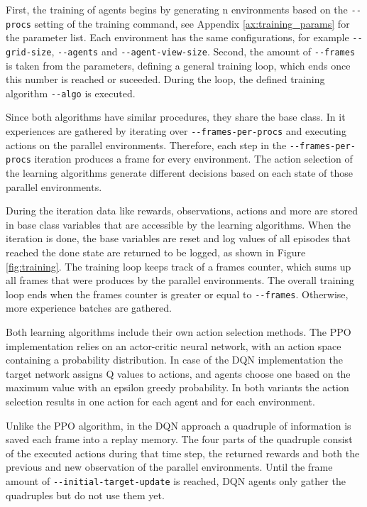 First, the training of agents begins by generating n environments based on the \verb|--procs| setting of the training command, see Appendix \ref{ax:training_params} for the parameter list. Each environment has the same configurations, for example \verb|--grid-size|, \verb|--agents| and \verb|--agent-view-size|. Second, the amount of \verb|--frames| is taken from the parameters, defining a general training loop, which ends once this number is reached or suceeded. During the loop, the defined training algorithm \verb|--algo| is executed.

Since both algorithms have similar procedures, they share the base class. In it experiences are gathered by iterating over \verb|--frames-per-procs| and executing actions on the parallel environments. Therefore, each step in the \verb|--frames-per-procs| iteration produces a frame for every environment. The action selection of the learning algorithms generate different decisions based on each state of those parallel environments.

During the iteration data like rewards, observations, actions and more are stored in base class variables that are accessible by the learning algorithms. When the iteration is done, the base variables are reset and log values of all episodes that reached the done state are returned to be logged, as shown in Figure \ref{fig:training}. The training loop keeps track of a frames counter, which sums up all frames that were produces by the parallel environments. The overall training loop ends when the frames counter is greater or equal to \verb|--frames|. Otherwise, more experience batches are gathered.

Both learning algorithms include their own action selection methods. The PPO implementation relies on an actor-critic neural network, with an action space containing a probability distribution. In case of the DQN implementation the target network assigns Q values to actions, and agents choose one based on the maximum value with an epsilon greedy probability. In both variants the action selection results in one action for each agent and for each environment.

Unlike the PPO algorithm, in the DQN approach a quadruple of information is saved each frame into a replay memory. The four parts of the quadruple consist of the executed actions during that time step, the returned rewards and both the previous and new observation of the parallel environments. Until the frame amount of \verb|--initial-target-update| is reached, DQN agents only gather the quadruples but do not use them yet.


